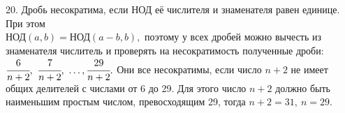 20. Дробь несократима, если НОД её числителя и знаменателя равен единице. При этом\\ НОД$(a,b)=$НОД$(a-b,b),$ поэтому у всех дробей можно вычесть из знаменателя числитель и проверять на несократимость полученные дроби: $\cfrac{6}{n+2},\ \cfrac{7}{n+2},\ \ldots, \cfrac{29}{n+2}.$ Они все несократимы, если число $n+2$ не имеет общих делителей с числами от 6 до 29. Для этого число $n+2$ должно быть наименьшим простым числом, превосходящим 29, тогда $n+2=31,\ n=29.$\\
